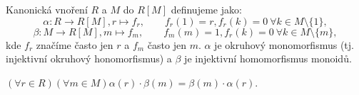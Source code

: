 \documentclass[12pt]{article}					%
\begin{document}
\begin{definice}
	Kanonická vnoření $R$ a $M$ do $R[M]$ definujeme jako:
	$$ α: R \rightarrow R[M], r \mapsto f_r, \qquad f_r(1) = r, f_r(k) = 0\ \forall k \in M \setminus \{1\}, $$
	$$ β: M \rightarrow R[M], m \mapsto f_m, \qquad f_m(m) = 1, f_r(k) = 0\ \forall k \in M \setminus \{m\}, $$
	kde $f_r$ značíme často jen $r$ a $f_m$ často jen $m$. $α$ je okruhový monomorfismus (tj. injektivní okruhový honomorfismus) a $β$ je injektivní homomorfismus monoidů.
\end{definice}

\begin{poznamka}[Pozorování]
	$(\forall r \in R)(\forall m \in M) α(r)·β(m) = β(m)·α(r)$.
\end{poznamka}
\end{document}
